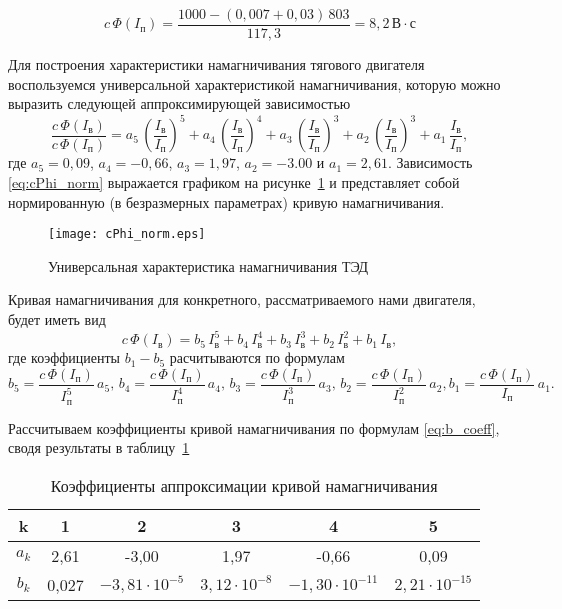 \begin{equation*}
 c\,\Phi(I_{\text{п}}) = \frac{1000 - \left( 0,007 + 0,03 \right) \, 803 }{117,3} = 8,2 \, \text{В} \cdot \text{с}
\end{equation*}

Для построения характеристики намагничивания тягового двигателя воспользуемся универсальной характеристикой намагничивания, которую можно выразить следующей аппроксимирующей зависимостью
\begin{equation}
 \label{eq:cPhi_norm}
 \frac{c\,\Phi\left(I_{\text{в}}\right)}{c\,\Phi\left(I_{\text{п}}\right)} = a_5 \, \left( \frac{I_{\text{в}}}{I_{\text{п}}} \right)^5 + a_4 \, \left( \frac{I_{\text{в}}}{I_{\text{п}}} \right)^4 + a_3 \, \left( \frac{I_{\text{в}}}{I_{\text{п}}} \right)^3 + a_2 \, \left( \frac{I_{\text{в}}}{I_{\text{п}}} \right)^3 + a_1 \, \frac{I_{\text{в}}}{I_{\text{п}}}, 
\end{equation}
где $a_5 = 0,09$, $a_4 = -0,66$, $a_3 = 1,97$, $a_2 = -3.00$ и $a_1 = 2,61$. Зависимость \eqref{eq:cPhi_norm} выражается графиком на рисунке~\ref{fig:cPhi_norm} и представляет собой нормированную (в безразмерных параметрах) кривую намагничивания.

\begin{figure}[H]
    \centering    
    \texttt{[image: cPhi\_norm.eps]}
    \caption{Универсальная характеристика намагничивания ТЭД}
    \label{fig:cPhi_norm}
\end{figure}

Кривая намагничивания для конкретного, рассматриваемого нами двигателя, будет иметь вид
\begin{equation}
 \label{eq:cPhi}
 c\,\Phi\left(I_{\text{в}}\right) = b_5 \, I_{\text{в}}^5 + b_4 \, I_{\text{в}}^4 + b_3 \, I_{\text{в}}^3 + b_2 \, I_{\text{в}}^2 + b_1 \, I_{\text{в}},  
\end{equation}
где коэффициенты $b_1 - b_5$ расчитываются по формулам
\begin{equation}
 \label{eq:b_coeff}
 b_5 = \frac{c\,\Phi\left(I_{\text{п}}\right)}{I_{\text{п}}^5} \, a_5, \, b_4 = \frac{c\,\Phi\left(I_{\text{п}}\right)}{I_{\text{п}}^4} \, a_4, \, b_3 = \frac{c\,\Phi\left(I_{\text{п}}\right)}{I_{\text{п}}^3} \, a_3, \, b_2 = \frac{c\,\Phi\left(I_{\text{п}}\right)}{I_{\text{п}}^2} \, a_2, b_1 = \frac{c\,\Phi\left(I_{\text{п}}\right)}{I_{\text{п}}} \, a_1. 
\end{equation}

Рассчитываем коэффициенты кривой намагничивания по формулам \eqref{eq:b_coeff}, сводя результаты в таблицу~\ref{tab:b_coeff}
\begin{table}[H]
\centering
\caption{Коэффициенты аппроксимации кривой намагничивания}
\begin{tabular}{|c||c|c|c|c|c|}
 \hline
 k & 1 & 2 & 3 & 4 & 5 \\ \hline
 $a_k$ & 2,61 & -3,00 & 1,97 & -0,66 & 0,09 \\ \hline
 $b_k$ & 0,027 & $-3,81 \cdot 10^{-5}$ & $3,12 \cdot 10^{-8}$ & $-1,30 \cdot 10^{-11}$ & $2,21 \cdot 10^{-15}$ \\ \hline
\end{tabular}
\label{tab:b_coeff}
\end{table}

